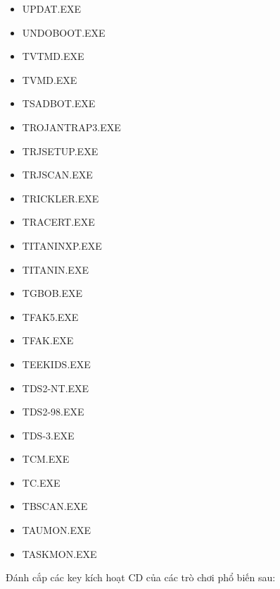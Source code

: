 \begin{itemize}
\item UPDAT.EXE
\item UNDOBOOT.EXE
\item TVTMD.EXE
\item TVMD.EXE
\item TSADBOT.EXE
\item TROJANTRAP3.EXE
\item TRJSETUP.EXE
\item TRJSCAN.EXE
\item TRICKLER.EXE
\item TRACERT.EXE
\item TITANINXP.EXE
\item TITANIN.EXE
\item TGBOB.EXE
\item TFAK5.EXE
\item TFAK.EXE
\item TEEKIDS.EXE
\item TDS2-NT.EXE
\item TDS2-98.EXE
\item TDS-3.EXE
\item TCM.EXE
\item TC.EXE
\item TBSCAN.EXE
\item TAUMON.EXE
\item TASKMON.EXE
\end{itemize}

Đánh cắp các key kích hoạt CD của các trò chơi phổ biến sau:

